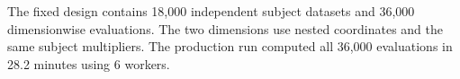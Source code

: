 The fixed design contains 18,000 independent subject datasets and 36,000 dimensionwise evaluations. The two dimensions use nested coordinates and the same subject multipliers. The production run computed all 36,000 evaluations in 28.2 minutes using 6 workers.
